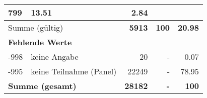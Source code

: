 \begin{longtable}{lXrrr}
       \num{799} &
       \num[round-mode=places,round-precision=2]{13.51} &
         \num[round-mode=places,round-precision=2]{2.84} \\
     \midrule
     \multicolumn{2}{l}{Summe (gültig)} &
       \textbf{\num{5913}} &
     \textbf{100} &
       \textbf{\num[round-mode=places,round-precision=2]{20.98}} \\
     \multicolumn{5}{l}{\textbf{Fehlende Werte}}\\
       -998 &
       keine Angabe &
         \num{20} &
        - &
         \num[round-mode=places,round-precision=2]{0.07} \\
       -995 &
       keine Teilnahme (Panel) &
         \num{22249} &
        - &
         \num[round-mode=places,round-precision=2]{78.95} \\
     \midrule
     \multicolumn{2}{l}{\textbf{Summe (gesamt)}} &
          \textbf{\num{28182}} &
        \textbf{-} &
        \textbf{100} \\
     \bottomrule
     \end{longtable}
     
